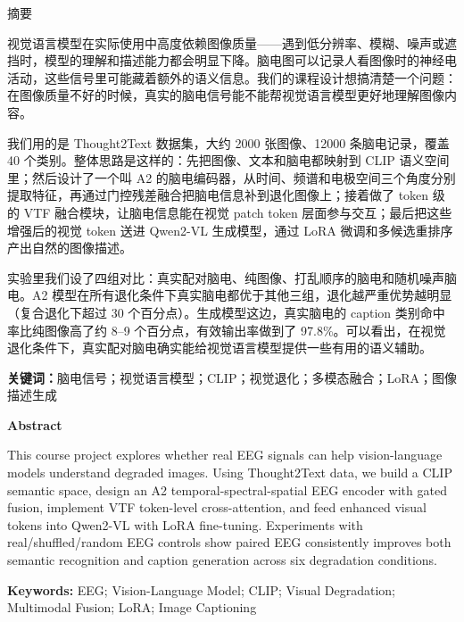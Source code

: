 \begin{center}
{\heitifont{} 摘\quad 要}
\end{center}

视觉语言模型在实际使用中高度依赖图像质量——遇到低分辨率、模糊、噪声或遮挡时，模型的理解和描述能力都会明显下降。脑电图可以记录人看图像时的神经电活动，这些信号里可能藏着额外的语义信息。我们的课程设计想搞清楚一个问题：在图像质量不好的时候，真实的脑电信号能不能帮视觉语言模型更好地理解图像内容。

我们用的是 Thought2Text 数据集，大约 2000 张图像、12000 条脑电记录，覆盖 40 个类别。整体思路是这样的：先把图像、文本和脑电都映射到 CLIP 语义空间里；然后设计了一个叫 A2 的脑电编码器，从时间、频谱和电极空间三个角度分别提取特征，再通过门控残差融合把脑电信息补到退化图像上；接着做了 token 级的 VTF 融合模块，让脑电信息能在视觉 patch token 层面参与交互；最后把这些增强后的视觉 token 送进 Qwen2-VL 生成模型，通过 LoRA 微调和多候选重排序产出自然的图像描述。

实验里我们设了四组对比：真实配对脑电、纯图像、打乱顺序的脑电和随机噪声脑电。A2 模型在所有退化条件下真实脑电都优于其他三组，退化越严重优势越明显（复合退化下超过 30 个百分点）。生成模型这边，真实脑电的 caption 类别命中率比纯图像高了约 8--9 个百分点，有效输出率做到了 97.8\%。可以看出，在视觉退化条件下，真实配对脑电确实能给视觉语言模型提供一些有用的语义辅助。

\vspace{0.5cm}
\noindent\textbf{关键词：}脑电信号；视觉语言模型；CLIP；视觉退化；多模态融合；LoRA；图像描述生成

\clearpage
\begin{center}
{\bfseries{} Abstract}
\end{center}

This course project explores whether real EEG signals can help vision-language models understand degraded images. Using Thought2Text data, we build a CLIP semantic space, design an A2 temporal-spectral-spatial EEG encoder with gated fusion, implement VTF token-level cross-attention, and feed enhanced visual tokens into Qwen2-VL with LoRA fine-tuning. Experiments with real/shuffled/random EEG controls show paired EEG consistently improves both semantic recognition and caption generation across six degradation conditions.

\vspace{0.5cm}
\noindent\textbf{Keywords:} EEG; Vision-Language Model; CLIP; Visual Degradation; Multimodal Fusion; LoRA; Image Captioning
